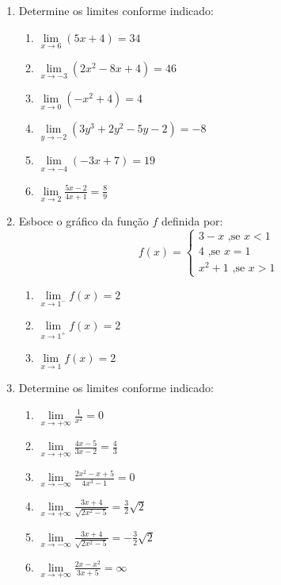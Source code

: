 \documentclass[oneside,a4paper,12pt]{article}
\begin{document}
\begin{enumerate}
	
	\item Determine os limites conforme indicado:
	\begin{multicols}{2}
		\begin{enumerate}
			\item $\lim\limits_{x\rightarrow 6}(5x + 4) = 34$
			\item $\lim\limits_{x\rightarrow -3}(2x^2 - 8x + 4) = 46$
			\item $\lim\limits_{x\rightarrow 0}(-x^2 + 4) = 4$
			\item $\lim\limits_{y\rightarrow -2}(3y^3 + 2y^2 - 5y - 2) = -8$
			\item $\lim\limits_{x\rightarrow -4}(-3x + 7) = 19$
			\item $\lim\limits_{x\rightarrow 2}\frac{5x - 2}{4x + 1} = \frac{8}{9}$
		\end{enumerate}
	\end{multicols}
	
	\item Esboce o gráfico da função $f$ definida por:
	$$f(x) = \begin{cases}
	3 - x \text{ ,se } x < 1 \\
	4	\text{ ,se } x =1 \\
	x^2 + 1 \text{ ,se } x>1 
	\end{cases}
	$$
	\begin{multicols}{3}
	\begin{enumerate}
		\item $\lim\limits_{x\rightarrow 1^{-}}f(x) = 2$
		\item $\lim\limits_{x\rightarrow 1^{+}}f(x) = 2$
		\item $\lim\limits_{x\rightarrow 1}f(x) = 2$
	\end{enumerate}
	\end{multicols}

	\item Determine os limites conforme indicado:
	\begin{multicols}{2}
		\begin{enumerate}
			\item $\lim\limits_{x\rightarrow + \infty}\frac{1}{x^2} = 0$
			\item $\lim\limits_{x\rightarrow + \infty}\frac{4x - 5}{3x - 2} = \frac{4}{3}$
			\item $\lim\limits_{x\rightarrow - \infty}\frac{2x^2 - x + 5}{4x^3 - 1} = 0$
			\item $\lim\limits_{x\rightarrow + \infty}\frac{3x + 4}{\sqrt{2x^2 - 5}} = \frac{3}{2}\sqrt{2}$
			\item $\lim\limits_{x\rightarrow - \infty}\frac{3x+4}{\sqrt{2x^2 - 5}} = -\frac{3}{2}\sqrt{2}$
			\item $\lim\limits_{x\rightarrow + \infty}\frac{2x - x^2}{3x + 5} = \infty$
		\end{enumerate}
	\end{multicols}


\end{enumerate}
\end{document}
